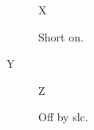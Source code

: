 \documentclass{article}
\begin{document}
\begin{figure}\centering X\caption{Short on.}\end{figure}
\begin{table}\centering\caption{Short off.}Y\end{table}
\begin{figure}\captionsetup{slc=off}\centering Z\caption{Off by slc.}\end{figure}
\end{document}
